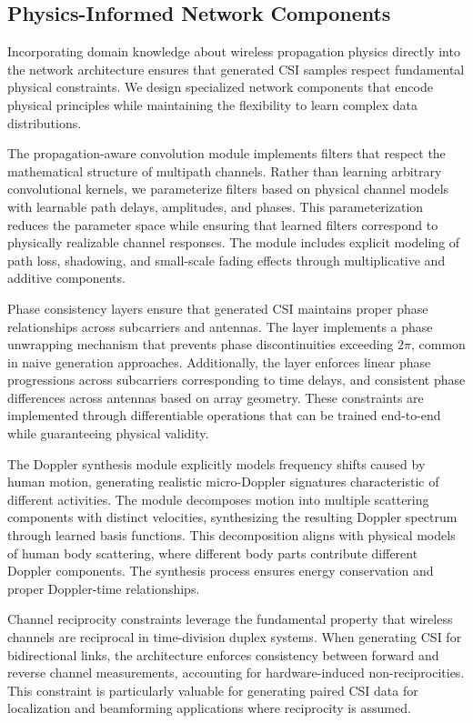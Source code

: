 \documentclass[journal]{IEEEtran}
\begin{document}
\subsection{Physics-Informed Network Components}

Incorporating domain knowledge about wireless propagation physics directly into the network architecture ensures that generated CSI samples respect fundamental physical constraints. We design specialized network components that encode physical principles while maintaining the flexibility to learn complex data distributions.

The propagation-aware convolution module implements filters that respect the mathematical structure of multipath channels. Rather than learning arbitrary convolutional kernels, we parameterize filters based on physical channel models with learnable path delays, amplitudes, and phases. This parameterization reduces the parameter space while ensuring that learned filters correspond to physically realizable channel responses. The module includes explicit modeling of path loss, shadowing, and small-scale fading effects through multiplicative and additive components.

Phase consistency layers ensure that generated CSI maintains proper phase relationships across subcarriers and antennas. The layer implements a phase unwrapping mechanism that prevents phase discontinuities exceeding $2\pi$, common in naive generation approaches. Additionally, the layer enforces linear phase progressions across subcarriers corresponding to time delays, and consistent phase differences across antennas based on array geometry. These constraints are implemented through differentiable operations that can be trained end-to-end while guaranteeing physical validity.

The Doppler synthesis module explicitly models frequency shifts caused by human motion, generating realistic micro-Doppler signatures characteristic of different activities. The module decomposes motion into multiple scattering components with distinct velocities, synthesizing the resulting Doppler spectrum through learned basis functions. This decomposition aligns with physical models of human body scattering, where different body parts contribute different Doppler components. The synthesis process ensures energy conservation and proper Doppler-time relationships.

Channel reciprocity constraints leverage the fundamental property that wireless channels are reciprocal in time-division duplex systems. When generating CSI for bidirectional links, the architecture enforces consistency between forward and reverse channel measurements, accounting for hardware-induced non-reciprocities. This constraint is particularly valuable for generating paired CSI data for localization and beamforming applications where reciprocity is assumed.
\end{document}
